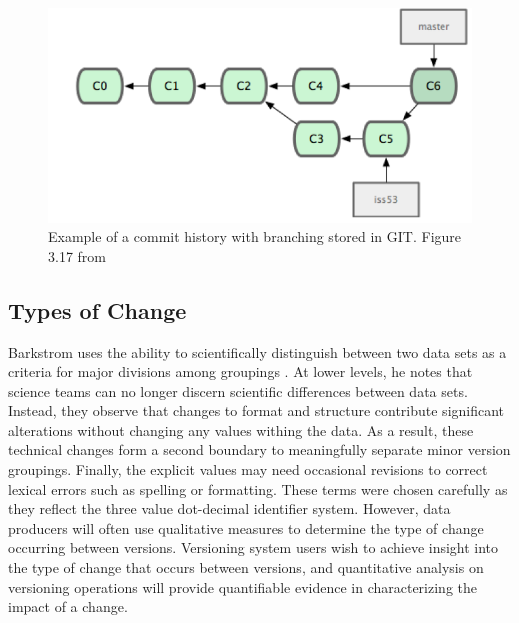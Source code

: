 \begin{figure}
	\centering
	\includegraphics[scale=0.75]{figures/GITCommitTree.png}
	\caption[Example of a commit history with branching stored in GIT.]{Example of a commit history with branching stored in GIT.  Figure 3.17 from \cite{Chacon:2009:PG:1618548}}
	\label{GITTree}
\end{figure}

\subsection{Types of Change}

Barkstrom uses the ability to scientifically distinguish between two data sets as a criteria for major divisions among groupings \cite{Barkstrom2003}.
At lower levels, he notes that science teams can no longer discern scientific differences between data sets.
Instead, they observe that changes to format and structure contribute significant alterations without changing any values withing the data.
As a result, these technical changes form a second boundary to meaningfully separate minor version groupings.
Finally, the explicit values may need occasional revisions to correct lexical errors such as spelling or formatting.
These terms were chosen carefully as they reflect the three value dot-decimal identifier system.
However, data producers will often use qualitative measures to determine the type of change occurring between versions.
Versioning system users wish to achieve insight into the type of change that occurs between versions, and quantitative analysis on versioning operations will provide quantifiable evidence in characterizing the impact of a change.

